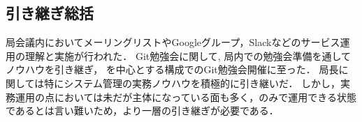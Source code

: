 \subsection*{引き継ぎ総括}


局会議内においてメーリングリストやGoogleグループ，Slackなどのサービス運用の理解と実施が行われた．
Git勉強会に関して, 局内での勉強会準備を通してノウハウを引き継ぎ， \secondGrade{}を中心とする構成でのGit勉強会開催に至った．
局長に関しては特にシステム管理の実務ノウハウを積極的に引き継いだ．
しかし，実務運用の点においては未だ\fourthGrade{}が主体になっている面も多く，\secondGrade{}のみで運用できる状態であるとは言い難いため，より一層の引き継ぎが必要である．
